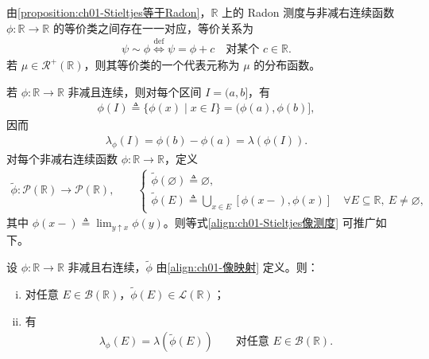 \documentclass[../../main.tex]{subfiles}%
\begin{document}
\begin{remark}\label{remark:ch01-分布函数}
由\cref{proposition:ch01-Stieltjes等于Radon}，$\mathbb{R}$ 上的 Radon 测度与非减右连续函数 $\phi:\mathbb{R}\to\mathbb{R}$ 的等价类之间存在一一对应，等价关系为
\begin{align*}
\psi\sim\phi\overset{\mathrm{def}}{\Longleftrightarrow}\psi=\phi+c\quad\text{对某个 }c\in\mathbb{R}.
\end{align*}
若 $\mu\in\mathcal{R}^+(\mathbb{R})$，则其等价类的一个代表元称为 $\mu$ 的分布函数。

若 $\phi:\mathbb{R}\to\mathbb{R}$ 非减且连续，则对每个区间 $I=(a,b]$，有
\begin{align*}
\phi(I)\triangleq\{\phi(x)\mid x\in I\}=(\phi(a),\phi(b)],
\end{align*}
因而
\begin{align}
\lambda_\phi(I)=\phi(b)-\phi(a)=\lambda(\phi(I)). \label{align:ch01-Stieltjes像测度}
\end{align}
对每个非减右连续函数 $\phi:\mathbb{R}\to\mathbb{R}$，定义
\begin{align}
\widetilde{\phi}:\mathcal{P}(\mathbb{R})\to\mathcal{P}(\mathbb{R}),\qquad
\begin{cases}
\widetilde{\phi}(\varnothing)\triangleq\varnothing,\\
\widetilde{\phi}(E)\triangleq\bigcup_{x\in E}[\phi(x-),\phi(x)]\quad\forall E\subseteq\mathbb{R},\ E\neq\varnothing,
\end{cases} 
\label{align:ch01-像映射}
\end{align}
其中 $\phi(x-)\triangleq\lim_{y\uparrow x}\phi(y)$。则等式\eqref{align:ch01-Stieltjes像测度} 可推广如下。
\end{remark}


\begin{proposition}\label{proposition:ch01-Stieltjes像}\label{proposition:ch01-Radon投影}
设 $\phi:\mathbb{R}\to\mathbb{R}$ 非减且右连续，$\widetilde{\phi}$ 由\eqref{align:ch01-像映射} 定义。则：
\begin{enumerate}[(i)]
\item 对任意 $E\in\mathcal{B}(\mathbb{R})$，$\widetilde{\phi}(E)\in\mathcal{L}(\mathbb{R})$；
\item 有
\begin{align}
\lambda_\phi(E)=\lambda(\widetilde{\phi}(E))\qquad\text{对任意 }E\in\mathcal{B}(\mathbb{R}). \label{align:ch01-Stieltjes像公式}
\end{align}
\end{enumerate}
\end{proposition}
\end{document}
